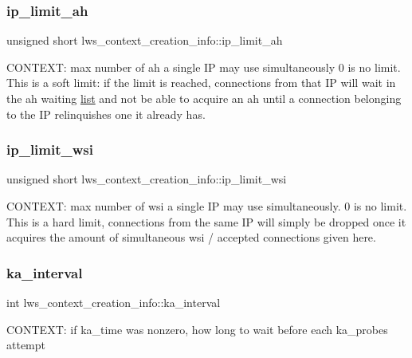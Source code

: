 \subsubsection{\texorpdfstring{ip\+\_\+limit\+\_\+ah}{ip\_limit\_ah}}
{\footnotesize\ttfamily unsigned short lws\+\_\+context\+\_\+creation\+\_\+info\+::ip\+\_\+limit\+\_\+ah}

C\+O\+N\+T\+E\+XT\+: max number of ah a single IP may use simultaneously 0 is no limit. This is a soft limit\+: if the limit is reached, connections from that IP will wait in the ah waiting \hyperlink{protocollist-p}{list} and not be able to acquire an ah until a connection belonging to the IP relinquishes one it already has. \mbox{\label{structlws__context__creation__info_ae3336f5097e8206ea21eaa37242c3c41}} 
\subsubsection{\texorpdfstring{ip\+\_\+limit\+\_\+wsi}{ip\_limit\_wsi}}
{\footnotesize\ttfamily unsigned short lws\+\_\+context\+\_\+creation\+\_\+info\+::ip\+\_\+limit\+\_\+wsi}

C\+O\+N\+T\+E\+XT\+: max number of wsi a single IP may use simultaneously. 0 is no limit. This is a hard limit, connections from the same IP will simply be dropped once it acquires the amount of simultaneous wsi / accepted connections given here. \mbox{\label{structlws__context__creation__info_a381342a398883d6204955ff3c1849ddd}} 
\subsubsection{\texorpdfstring{ka\+\_\+interval}{ka\_interval}}
{\footnotesize\ttfamily int lws\+\_\+context\+\_\+creation\+\_\+info\+::ka\+\_\+interval}

C\+O\+N\+T\+E\+XT\+: if ka\+\_\+time was nonzero, how long to wait before each ka\+\_\+probes attempt \mbox{\label{structlws__context__creation__info_a3baab4285c679fbe027c2504621d7410}} 
